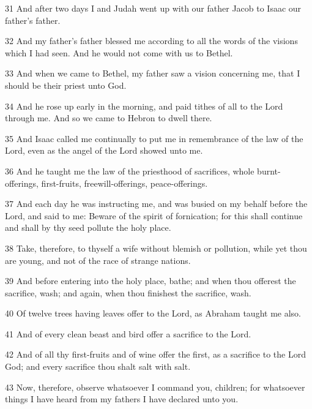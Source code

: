 \par 31 And after two days I and Judah went up with our father Jacob to Isaac our father's father.

\par 32 And my father's father blessed me according to all the words of the visions which I had seen. And he would not come with us to Bethel.

\par 33 And when we came to Bethel, my father saw a vision concerning me, that I should be their priest unto God.

\par 34 And he rose up early in the morning, and paid tithes of all to the Lord through me. And so we came to Hebron to dwell there.

\par 35 And Isaac called me continually to put me in remembrance of the law of the Lord, even as the angel of the Lord showed unto me.

\par 36 And he taught me the law of the priesthood of sacrifices, whole burnt-offerings, first-fruits, freewill-offerings, peace-offerings.

\par 37 And each day he was instructing me, and was busied on my behalf before the Lord, and said to me: Beware of the spirit of fornication; for this shall continue and shall by thy seed pollute the holy place.

\par 38 Take, therefore, to thyself a wife without blemish or pollution, while yet thou are young, and not of the race of strange nations.

\par 39 And before entering into the holy place, bathe; and when thou offerest the sacrifice, wash; and again, when thou finishest the sacrifice, wash.

\par 40 Of twelve trees having leaves offer to the Lord, as Abraham taught me also.

\par 41 And of every clean beast and bird offer a sacrifice to the Lord.

\par 42 And of all thy first-fruits and of wine offer the first, as a sacrifice to the Lord God; and every sacrifice thou shalt salt with salt.

\par 43 Now, therefore, observe whatsoever I command you, children; for whatsoever things I have heard from my fathers I have declared unto you.

